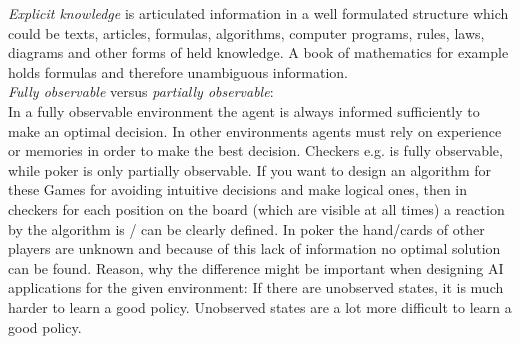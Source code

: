 \documentclass[10pt,a4paper]{article}
\begin{document}
		\noindent \textit{Explicit knowledge} is articulated information in a well formulated structure which could be texts, articles, formulas, algorithms, computer programs, rules, laws, diagrams and other forms of held knowledge. A book of mathematics for example holds formulas and therefore unambiguous information. 
		\\
		
		
		
		\noindent \textit{Fully observable} versus \textit{partially observable}:
		\\ 
		In a fully observable environment the agent is always informed sufficiently to make an optimal decision. In other environments agents must rely on experience or memories in order to make the best decision.
		Checkers e.g. is fully observable, while poker is only partially observable. If you want to design an algorithm for these Games for avoiding intuitive decisions and make logical ones, then in checkers for each position on the board (which are visible at all times) a reaction by the algorithm is / can be clearly defined. In poker the hand/cards of other players are unknown and because of this lack of information no optimal solution can be found.
		Reason, why the difference might be important when designing AI applications for the given environment:
		If there are unobserved states, it is much harder to learn a good policy. Unobserved states are a lot more difficult to learn a good policy.
		\\
		
\end{document}
